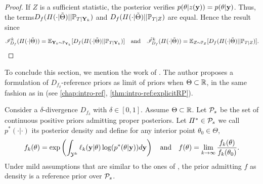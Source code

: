 \begin{proof}
    If $Z$ is a sufficient statistic, the posterior verifies $p(\theta|z(\mathbf{y}))= p(\theta|\mathbf{y})$. Thus, the terms$D_f(\varPi(\cdot|\tilde\Theta)||\mathbb{P}_{T|\mathbf{Y}_k})$ and $D_f(\varPi(\cdot|\tilde\Theta)||\mathbb{P}_{T|Z})  $ are equal. Hence the result since
        \begin{equation}
            \mathscr{I}^k_{D_f}(\varPi(\cdot|\tilde\Theta)) = \mathbb{E}_{\mathbf{Y}_k\sim\mathbb{P}_{\mathbf{Y}_k}}[D_f(\varPi(\cdot|\tilde\Theta)||\mathbb{P}_{T|\mathbf{Y}_k}) ] \quad\text{and} \quad \tilde{\mathscr{I}}^k_{D_f}(\varPi(\cdot|\tilde\Theta)) = \mathbb{E}_{ Z\sim\mathbb{P}_{Z}}[D_f(\varPi(\cdot|\tilde\Theta)||\mathbb{P}_{T|Z}) ] .
        \end{equation}
\end{proof}


To conclude this section, we mention the work of \citet{le_formal_2014}. The author proposes a formulation of  $D_{f_\delta}$-reference priors as limit of priors when $\Theta\subset\mathbb{R}$, in the same fashion as in \cite{berger_formal_2009} (see \cref{chap:intro-ref}, \cref{thm:intro-ref:explicitRP}).
\begin{thm}
    Consider a $\delta$-divergence $D_{f_\delta}$ with $\delta\in[0,1]$. Assume $\Theta\subset\mathbb{R}$. Let $\mathcal{P}_s$ be the set of continuous positive priors admitting proper posteriors.
%
    Let $\varPi^\ast\in\mathcal{P}_s$ we call $p^\ast(\cdot|\cdot)$ its posterior density and define for any interior point $\theta_0\in\Theta$,
        \begin{equation}
                f_k(\theta) = \exp\left(\int_{\cY^k}\ell_k(\mbf y|\theta)\log(p^\ast(\theta|\mbf y)) d\mbf y \right) \quad\text{and}\quad  %
                f(\theta) = \lim_{k\rightarrow\infty}\frac{f_k(\theta)}{f_k(\theta_0)}.
        \end{equation}
        Under mild assumptions that are similar to the ones of \cite{berger_formal_2009}, the prior admitting $f$ as density is a reference prior over $\mathcal{P}_s$.
\end{thm}



